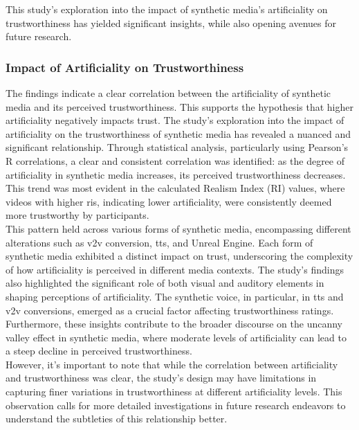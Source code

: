 \documentclass[
  a4paper,  %
  twoside,  %
  bibliography=totoc,
  headsepline,
  cleardoublepage=empty,
  parskip=half,
  draft=false
]{scrbook}
\begin{document}
This study's exploration into the impact of synthetic media's artificiality on trustworthiness has yielded significant insights, while also opening avenues for future research.

\subsubsection{Impact of Artificiality on Trustworthiness}
The findings indicate a clear correlation between the artificiality of synthetic media and its perceived trustworthiness. This supports the hypothesis that higher artificiality negatively impacts trust. The study's exploration into the impact of artificiality on the trustworthiness of synthetic media has revealed a nuanced and significant relationship. Through statistical analysis, particularly using Pearson's R correlations, a clear and consistent correlation was identified: as the degree of artificiality in synthetic media increases, its perceived trustworthiness decreases. This trend was most evident in the calculated Realism Index (RI) values, where videos with higher \gls{ri}s, indicating lower artificiality, were consistently deemed more trustworthy by participants. \\
This pattern held across various forms of synthetic media, encompassing different alterations such as \gls{v2v} conversion, \gls{tts}, and Unreal Engine. Each form of synthetic media exhibited a distinct impact on trust, underscoring the complexity of how artificiality is perceived in different media contexts. The study's findings also highlighted the significant role of both visual and auditory elements in shaping perceptions of artificiality. The synthetic voice, in particular, in \gls{tts} and \gls{v2v} conversions, emerged as a crucial factor affecting trustworthiness ratings. \\
Furthermore, these insights contribute to the broader discourse on the uncanny valley effect in synthetic media, where moderate levels of artificiality can lead to a steep decline in perceived trustworthiness. \\
However, it's important to note that while the correlation between artificiality and trustworthiness was clear, the study's design may have limitations in capturing finer variations in trustworthiness at different artificiality levels. This observation calls for more detailed investigations in future research endeavors to understand the subtleties of this relationship better.
\end{document}
